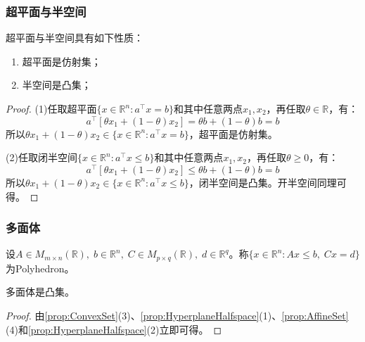 \subsubsection{超平面与半空间}
\begin{property}\label{prop:HyperplaneHalfspace}
	超平面与半空间具有如下性质：
	\begin{enumerate}
		\item 超平面是仿射集；
		\item 半空间是凸集；
	\end{enumerate}
\end{property}
\begin{proof}
	(1)任取超平面$\{x\in\mathbb{R}^{n}:a^{\top}x=b\}$和其中任意两点$x_1,x_2$，再任取$\theta\in\mathbb{R}$，有：
	\begin{equation*}
		a^{\top}[\theta x_1+(1-\theta)x_2]=\theta b+(1-\theta)b=b
	\end{equation*}
	所以$\theta x_1+(1-\theta)x_2\in\{x\in\mathbb{R}^{n}:a^{\top}x=b\}$，超平面是仿射集。\par
	(2)任取闭半空间$\{x\in\mathbb{R}^{n}:a^{\top}x\leqslant b\}$和其中任意两点$x_1,x_2$，再任取$\theta\geqslant0$，有：
	\begin{equation*}
		a^{\top}[\theta x_1+(1-\theta)x_2]\leqslant\theta b+(1-\theta)b=b
	\end{equation*}
	所以$\theta x_1+(1-\theta)x_2\in\{x\in\mathbb{R}^{n}:a^{\top}x\leqslant b\}$，闭半空间是凸集。开半空间同理可得。
\end{proof}
\subsubsection{多面体}
\begin{definition}
	设$A\in M_{m\times n}(\mathbb{R}),\;b\in\mathbb{R}^{n},\;C\in M_{p\times q}(\mathbb{R}),\;d\in\mathbb{R}^{q}$。称$\{x\in\mathbb{R}^{n}:Ax\leqslant b,\;Cx=d\}$为\gls{Polyhedron}。
\end{definition}
\begin{property}
	多面体是凸集。
\end{property}
\begin{proof}
	由\cref{prop:ConvexSet}(3)、\cref{prop:HyperplaneHalfspace}(1)、\cref{prop:AffineSet}(4)和\cref{prop:HyperplaneHalfspace}(2)立即可得。
\end{proof}
